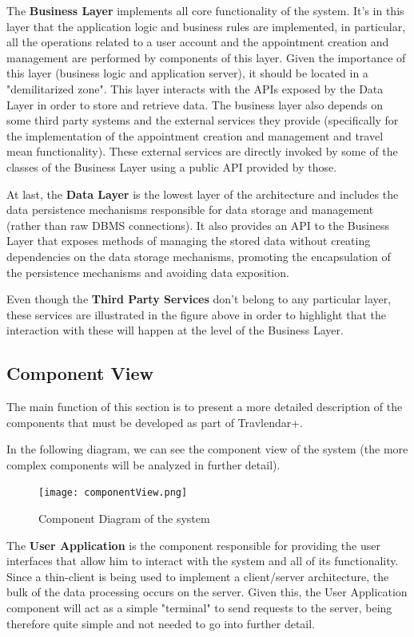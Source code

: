 \documentclass[12pt]{article}
\begin{document}
The \textbf{Business Layer} implements all core functionality of the system. It's in this layer that the application logic and business rules are implemented, in particular, all the operations related to a user account and the appointment creation and management are performed by components of this layer. Given the importance of this layer (business logic and application server), it should be located in a "demilitarized zone". This layer interacts with the APIs exposed by the Data Layer in order to store and retrieve data. The business layer also depends on some third party systems and the external services they provide (specifically for the implementation of the appointment creation and management and travel mean functionality). These external services are directly invoked by some of the classes of the Business Layer using a public API provided by those.

At last, the \textbf{Data Layer} is the lowest layer of the architecture and includes the data persistence mechanisms responsible for data storage and management (rather than raw DBMS connections). It also provides an API to the Business Layer that exposes methods of managing the stored data without creating dependencies on the data storage mechanisms, promoting the encapsulation of the persistence mechanisms and avoiding data exposition. 

Even though the \textbf{Third Party Services} don't belong to any particular layer, these services are illustrated in the figure above in order to highlight that the interaction with these will happen at the level of the Business Layer.
\subsection{Component View}
The main function of this section is to present a more detailed description of the components that must be developed as part of Travlendar+.

In the following diagram, we can see the component view of the system (the more complex components will be analyzed in further detail).
\begin{figure}[H]
    \centering
    \texttt{[image: componentView.png]}
    \caption{Component Diagram of the system}
    \label{fig:componentView}
\end{figure}
The \textbf{User Application} is the component responsible for providing the user interfaces that allow him to interact with the system and all of its functionality. Since a thin-client is being used to implement a client/server architecture, the bulk of the data processing occurs on the server. Given this, the User Application component will act as a simple "terminal" to send requests to the server, being therefore quite simple and not needed to go into further detail.
\end{document}
